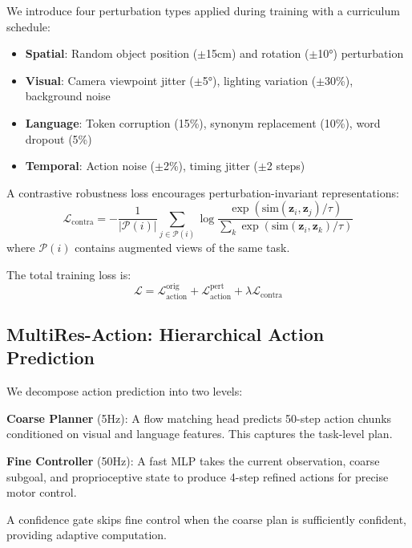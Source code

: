 \documentclass[11pt]{article}
\begin{document}
We introduce four perturbation types applied during training with a curriculum schedule:

\begin{itemize}
    \item \textbf{Spatial}: Random object position ($\pm$15cm) and rotation ($\pm$10°) perturbation
    \item \textbf{Visual}: Camera viewpoint jitter ($\pm$5°), lighting variation ($\pm$30\%), background noise
    \item \textbf{Language}: Token corruption (15\%), synonym replacement (10\%), word dropout (5\%)
    \item \textbf{Temporal}: Action noise ($\pm$2\%), timing jitter ($\pm$2 steps)
\end{itemize}

A contrastive robustness loss encourages perturbation-invariant representations:
\begin{equation}
    \mathcal{L}_{\text{contra}} = -\frac{1}{|\mathcal{P}(i)|}\sum_{j \in \mathcal{P}(i)} \log \frac{\exp(\text{sim}(\mathbf{z}_i, \mathbf{z}_j)/\tau)}{\sum_{k} \exp(\text{sim}(\mathbf{z}_i, \mathbf{z}_k)/\tau)}
\end{equation}
where $\mathcal{P}(i)$ contains augmented views of the same task.

The total training loss is:
\begin{equation}
    \mathcal{L} = \mathcal{L}_{\text{action}}^{\text{orig}} + \mathcal{L}_{\text{action}}^{\text{pert}} + \lambda \mathcal{L}_{\text{contra}}
\end{equation}

\subsection{MultiRes-Action: Hierarchical Action Prediction}
\label{sec:multires}

We decompose action prediction into two levels:

\textbf{Coarse Planner} (5Hz): A flow matching head predicts 50-step action chunks conditioned on visual and language features. This captures the task-level plan.

\textbf{Fine Controller} (50Hz): A fast MLP takes the current observation, coarse subgoal, and proprioceptive state to produce 4-step refined actions for precise motor control.

A confidence gate skips fine control when the coarse plan is sufficiently confident, providing adaptive computation.
\end{document}
